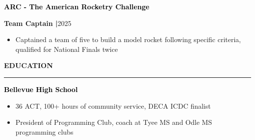 \documentclass[8pt,a4paper]{altacv}
\newcommand{\resumebodysize}{\fontsize{8pt}{9pt}\selectfont}
\renewcommand{\cvsection}[2][]{%
  \bigskip%
  \vspace{3.686pt}%
  \ifstrequal{#1}{}{}{\marginpar{\vspace*{\dimexpr1pt-\baselineskip}\raggedright}}%
  {\color{heading}\large\bfseries\MakeUppercase{#2}}\\[-1ex]\vspace{1.489pt}%
  {\color{heading}\rule{\linewidth}{2pt}\par}\medskip\vspace{1.179pt}
}
\renewcommand{\cvevent}[4]{%
  {\fontsize{9pt}{9pt}\selectfont\color{black}\hspace*{-0.282pt}#1\par}
  \ifstrequal{#2}{}{}{%
    \vspace{2.144pt}
    {\fontsize{9pt}{9pt}\selectfont\textbf{\color{accent}#2}\hspace{0.5em}\resumebodysize\faCalendar\hspace{0.5em}#3\par}%
  }%
  \vspace{2.145pt}\resumebodysize
}
\begin{document}
\cvevent{\textcolor{black}{\textbf{ARC - The American Rocketry Challenge}}}{\textnormal{Team Captain |}}{2025}{}
\begin{itemize}
\item Captained a team of five to build a model rocket following specific criteria, qualified for National Finals twice
\end{itemize}

\vskip-3.343pt
\cvsection{Education}
\vskip-1.479pt

\cvevent{\textcolor{black}{\textbf{Bellevue High School}}}{}{}{}
\begin{itemize}
\item 36 ACT, 100+ hours of community service, DECA ICDC finalist
\item President of Programming Club, coach at Tyee MS and Odle MS programming clubs
\end{itemize}
\end{document}
